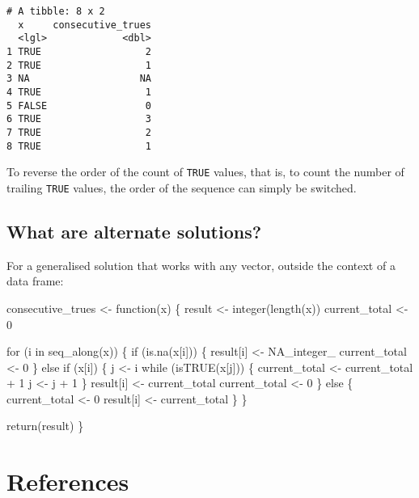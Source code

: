 \documentclass[
  letterpaper,
  DIV=11,
  numbers=noendperiod]{scrreprt}
\newenvironment{Shaded}{\begin{snugshade}}{\end{snugshade}}
\newcommand{\ConstantTok}[1]{\textcolor[rgb]{0.56,0.35,0.01}{#1}}
\newcommand{\ControlFlowTok}[1]{\textcolor[rgb]{0.00,0.23,0.31}{#1}}
\newcommand{\DecValTok}[1]{\textcolor[rgb]{0.68,0.00,0.00}{#1}}
\newcommand{\FunctionTok}[1]{\textcolor[rgb]{0.28,0.35,0.67}{#1}}
\newcommand{\NormalTok}[1]{\textcolor[rgb]{0.00,0.23,0.31}{#1}}
\newcommand{\OtherTok}[1]{\textcolor[rgb]{0.00,0.23,0.31}{#1}}
\newcommand{\SpecialCharTok}[1]{\textcolor[rgb]{0.37,0.37,0.37}{#1}}
\newlength{\cslhangindent}
\newenvironment{CSLReferences}[2] %
 {\begin{list}{}{%
  \setlength{\itemindent}{0pt}
  \setlength{\leftmargin}{0pt}
  \setlength{\parsep}{0pt}
  \ifodd #1
   \setlength{\leftmargin}{\cslhangindent}
   \setlength{\itemindent}{-1\cslhangindent}
  \fi
  \setlength{\itemsep}{#2\baselineskip}}}
 {\end{list}}
\begin{document}
\begin{verbatim}
# A tibble: 8 x 2
  x     consecutive_trues
  <lgl>             <dbl>
1 TRUE                  2
2 TRUE                  1
3 NA                   NA
4 TRUE                  1
5 FALSE                 0
6 TRUE                  3
7 TRUE                  2
8 TRUE                  1
\end{verbatim}

To reverse the order of the count of \texttt{TRUE} values, that is, to
count the number of trailing \texttt{TRUE} values, the order of the
sequence can simply be switched.

\section{What are alternate
solutions?}\label{what-are-alternate-solutions}

For a generalised solution that works with any vector, outside the
context of a data frame:

\begin{Shaded}
\begin{Highlighting}[]
\NormalTok{consecutive\_trues }\OtherTok{\textless{}{-}} \ControlFlowTok{function}\NormalTok{(x) \{}
\NormalTok{  result }\OtherTok{\textless{}{-}} \FunctionTok{integer}\NormalTok{(}\FunctionTok{length}\NormalTok{(x))}
\NormalTok{  current\_total }\OtherTok{\textless{}{-}} \DecValTok{0}

  \ControlFlowTok{for}\NormalTok{ (i }\ControlFlowTok{in} \FunctionTok{seq\_along}\NormalTok{(x)) \{}
    \ControlFlowTok{if}\NormalTok{ (}\FunctionTok{is.na}\NormalTok{(x[i])) \{}
\NormalTok{      result[i] }\OtherTok{\textless{}{-}} \ConstantTok{NA\_integer\_}
\NormalTok{      current\_total }\OtherTok{\textless{}{-}} \DecValTok{0}
\NormalTok{    \} }\ControlFlowTok{else} \ControlFlowTok{if}\NormalTok{ (x[i]) \{}
\NormalTok{      j }\OtherTok{\textless{}{-}}\NormalTok{ i}
      \ControlFlowTok{while}\NormalTok{ (}\FunctionTok{isTRUE}\NormalTok{(x[j])) \{}
\NormalTok{        current\_total }\OtherTok{\textless{}{-}}\NormalTok{ current\_total }\SpecialCharTok{+} \DecValTok{1}
\NormalTok{        j }\OtherTok{\textless{}{-}}\NormalTok{ j }\SpecialCharTok{+} \DecValTok{1}
\NormalTok{      \}}
\NormalTok{      result[i] }\OtherTok{\textless{}{-}}\NormalTok{ current\_total}
\NormalTok{      current\_total }\OtherTok{\textless{}{-}} \DecValTok{0}
\NormalTok{    \} }\ControlFlowTok{else}\NormalTok{ \{}
\NormalTok{      current\_total }\OtherTok{\textless{}{-}} \DecValTok{0}
\NormalTok{      result[i] }\OtherTok{\textless{}{-}}\NormalTok{ current\_total}
\NormalTok{    \}}
\NormalTok{  \}}

  \FunctionTok{return}\NormalTok{(result)}
\NormalTok{\}}
\end{Highlighting}
\end{Shaded}


\chapter*{References}\label{references}


\label{refs}
\begin{CSLReferences}{0}{1}
\end{CSLReferences}
\end{document}
